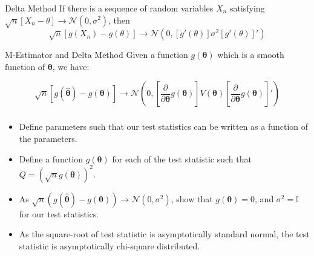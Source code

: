 \documentclass{beamer}
\begin{document}
\begin{frame}
	\frametitle{}
	\begin{block}{Delta Method}
		If there is a sequence of random variables $X_n$ satisfying $ \sqrt{n}[X_n - \theta] \rightarrow \mathcal{N}(0, \sigma^2) $, then
		$$ \sqrt{n}[g(X_n) - g(\theta)] \rightarrow \mathcal{N}(0, [g'(\theta)] \sigma^2 [g'(\theta)]')$$
	\end{block}
	\begin{block}{M-Estimator and Delta Method}
		Given a function $ g(\bm{\theta}) $ which is a smooth function of $ \bm{\theta} $, we have:

		$$ \sqrt{n} \left[ g(\hat{\bm{\theta}}) - g(\bm{\theta}) \right] \to \mathcal{N} \left( 0, \left[ \frac{\partial}{\partial \bm{\theta}} g(\bm{\theta}) \right] V(\bm{\theta}) \left[ \frac{\partial}{\partial \bm{\theta}} g(\bm{\theta}) \right]' \right) $$
	\end{block}
\end{frame}

\begin{frame}
	\frametitle{}
	\begin{itemize}
		\item Define parameters such that our test statistics can be written as a function of the parameters.
		\item Define a function $ g(\bm{\theta}) $ for each of the test statistic such that $ Q = (\sqrt{n}g(\bm{\theta}))^2 $.
		\item As $ \sqrt{n}(g(\hat{\bm{\theta}}) - g(\bm{\theta})) \to \mathcal{N}(0, \sigma^2) $, show that $ g(\bm{\theta}) = 0 $, and $ \sigma^2 = \mathbb{I} $ for our test statistics.
		\item As the square-root of test statistic is asymptotically standard normal, the test statistic is asymptotically chi-square distributed.
	\end{itemize}

\end{frame}
\end{document}
